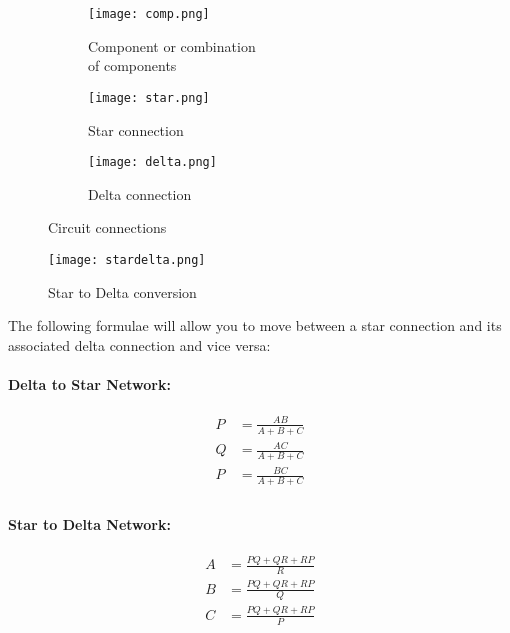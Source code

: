 \begin{figure}[!htb]
       \begin{subfigure}[t]{0.3\textwidth}
				\centering
                \texttt{[image: comp.png]}
                \captionsetup{justification=centering}
                \caption{Component or combination \\of components}
       \end{subfigure}%
       \begin{subfigure}[t]{0.3\textwidth}
				\centering
                \texttt{[image: star.png]}
                \caption{Star connection}
        \end{subfigure}%
        \begin{subfigure}[t]{0.3\textwidth}
        		\centering
                \texttt{[image: delta.png]}
                \caption{Delta connection}
        \end{subfigure}%
        \caption{Circuit connections}
        \label{starAndDelta}
\end{figure}

\begin{figure}[!htb]
\centering
\texttt{[image: stardelta.png]}
\caption{Star to Delta conversion}
\label{starToDelta}
\end{figure}

The following formulae will allow you to move between a star connection and its associated delta connection and vice versa:

\begin{minipage}{0.5\textwidth}
\centering
\paragraph*{Delta to Star Network:}
\begin{equation*}
\begin{aligned}
P &= \frac{A B}{A + B + C}\\
Q &= \frac{A C}{A + B + C}\\
P &= \frac{B C}{A + B + C}\\
\end{aligned}
\end{equation*}
\end{minipage}
\begin{minipage}{0.5\textwidth}
\centering
\paragraph*{Star to Delta Network:}
\begin{equation*}
\begin{aligned}
A &= \frac{P Q + Q R + R P}{R}\\
B &= \frac{P Q + Q R + R P}{Q}\\
C &= \frac{P Q + Q R + R P}{P}\\
\end{aligned}
\end{equation*}

\end{minipage}


